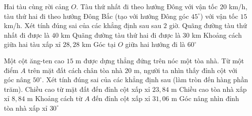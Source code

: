\begin{ex}%
	Hai tàu cùng rời cảng $O$. Tàu thứ nhất đi theo hướng Đông với vận tốc $20$ km/h, tàu thứ hai đi theo hướng Đông Bắc (tạo với hướng Đông góc $45^\circ$) với vận tốc $15$ km/h. Xét tính đúng sai của các khẳng định sau sau $2$ giờ.
	\choiceTF
		{\True Quãng đường tàu thứ nhất đi được là $40$ km}
		{\True Quãng đường tàu thứ hai đi được là $30$ km}
		{\True Khoảng cách giữa hai tàu xấp xỉ $28{,}28$ km}
		{Góc tại $O$ giữa hai hướng đi là $60^\circ$}
\end{ex}

\begin{ex}%
	Một cột ăng-ten cao $15$ m được dựng thẳng đứng trên nóc một tòa nhà. Từ một điểm $A$ trên mặt đất cách chân tòa nhà $20$ m, người ta nhìn thấy đỉnh cột với góc nâng $50^\circ$. Xét tính đúng sai của các khẳng định sau (làm tròn đến hàng phần trăm).
	\choiceTF
		{\True Chiều cao từ mặt đất đến đỉnh cột xấp xỉ $23{,}84$ m}
		{\True Chiều cao tòa nhà xấp xỉ $8{,}84$ m}
		{\True Khoảng cách từ $A$ đến đỉnh cột xấp xỉ $31{,}06$ m}
		{Góc nâng nhìn đỉnh tòa nhà xấp xỉ $30^\circ$}
\end{ex}

